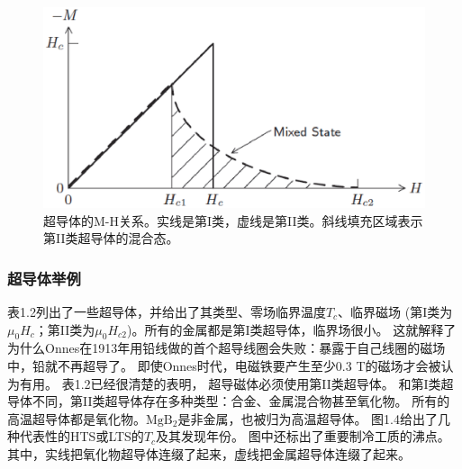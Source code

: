 \begin{figure}[htbp]
  \centering
 \includegraphics[scale=0.6]{chpt1/figs/fig1.3.eps}
  \caption{
超导体的M-H关系。实线是第I类，虚线是第II类。斜线填充区域表示第II类超导体的混合态。
}\label{mhcurve}
\end{figure}

\subsubsection{超导体举例}
表1.2列出了一些超导体，并给出了其类型、零场临界温度$T_c$、临界磁场
(第I类为$\mu_0H_c$；第II类为$\mu_0H_{c2}$)。所有的金属都是第I类超导体，临界场很小。
这就解释了为什么Onnes在1913年用铅线做的首个超导线圈会失败：暴露于自己线圈的磁场中，铅就不再超导了。
即使Onnes时代，电磁铁要产生至少0.3 T的磁场才会被认为有用。
表1.2已经很清楚的表明，
超导磁体必须使用第II类超导体。
和第I类超导体不同，第II类超导体存在多种类型：合金、金属混合物甚至氧化物。
所有的高温超导体都是氧化物。$\mathrm{MgB_2}$是非金属，也被归为高温超导体。
图1.4给出了几种代表性的HTS或LTS的$T_c$及其发现年份。
图中还标出了重要制冷工质的沸点。
其中，实线把氧化物超导体连缀了起来，虚线把金属超导体连缀了起来。

